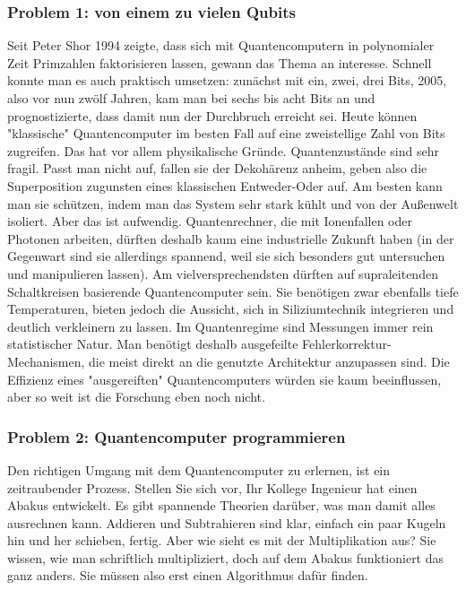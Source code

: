 \documentclass[a4paper,10pt]{scrartcl}
\begin{document}
\subsubsection{Problem 1: von einem zu vielen Qubits}
Seit Peter Shor 1994 zeigte, dass sich mit Quantencomputern in polynomialer Zeit Primzahlen faktorisieren lassen, gewann das Thema an interesse. Schnell konnte man es auch praktisch umsetzen: zunächst mit ein, zwei, drei Bits, 2005, also vor nun zwölf Jahren, kam man bei sechs bis acht Bits an und prognostizierte, dass damit nun der Durchbruch erreicht sei. Heute können "klassische" Quantencomputer im besten Fall auf eine zweistellige Zahl von Bits zugreifen.
Das hat vor allem physikalische Gründe. Quantenzustände sind sehr fragil. Passt man nicht auf, fallen sie der Dekohärenz anheim, geben also die Superposition zugunsten eines klassischen Entweder-Oder auf. Am besten kann man sie schützen, indem man das System sehr stark kühlt und von der Außenwelt isoliert. Aber das ist aufwendig. Quantenrechner, die mit Ionenfallen oder Photonen arbeiten, dürften deshalb kaum eine industrielle Zukunft haben (in der Gegenwart sind sie allerdings spannend, weil sie sich besonders gut untersuchen und manipulieren lassen). Am vielversprechendsten dürften auf supraleitenden Schaltkreisen basierende Quantencomputer sein. Sie benötigen zwar ebenfalls tiefe Temperaturen, bieten jedoch die Aussicht, sich in Siliziumtechnik integrieren und deutlich verkleinern zu lassen.
Im Quantenregime sind Messungen immer rein statistischer Natur. Man benötigt deshalb ausgefeilte Fehlerkorrektur-Mechanismen, die meist direkt an die genutzte Architektur anzupassen sind. Die Effizienz eines "ausgereiften" Quantencomputers würden sie kaum beeinflussen, aber so weit ist die Forschung eben noch nicht.

\subsubsection{Problem 2: Quantencomputer programmieren}
Den richtigen Umgang mit dem Quantencomputer zu erlernen, ist ein zeitraubender Prozess. Stellen Sie sich vor, Ihr Kollege Ingenieur hat einen Abakus entwickelt. Es gibt spannende Theorien darüber, was man damit alles ausrechnen kann. Addieren und Subtrahieren sind klar, einfach ein paar Kugeln hin und her schieben, fertig. Aber wie sieht es mit der Multiplikation aus? Sie wissen, wie man schriftlich multipliziert, doch auf dem Abakus funktioniert das ganz anders. Sie müssen also erst einen Algorithmus dafür finden.
\end{document}
